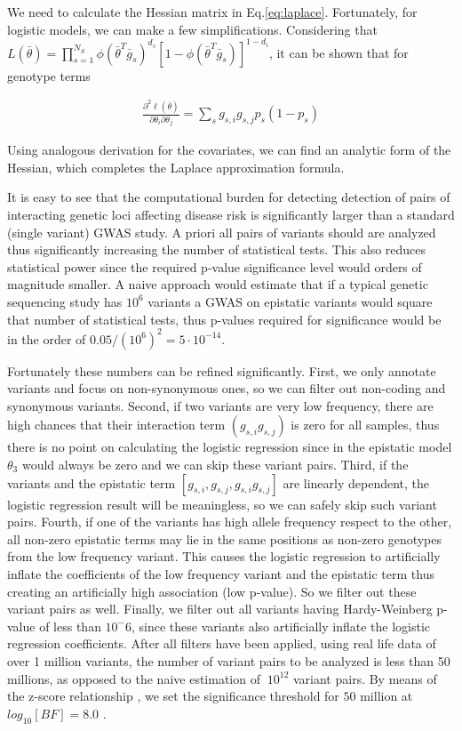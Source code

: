 We need to calculate the Hessian matrix in Eq.\ref{eq:laplace}. Fortunately, for logistic models, we can make a few simplifications. Considering that $L(\bar{\theta}) = \prod_{s=1}^{N_S}{ \phi( \bar{\theta}^T \bar{g}_s)^{d_s} [ 1-\phi( \bar{\theta}^T \bar{g}_s) ]^{1-d_i} }$, it can be shown that for genotype terms

\begin{eqnarray*}
	\frac{ \partial^2 \ell(\bar{\theta}) }{ \partial\theta_i \partial\theta_j } 
	= \sum_s{ g_{s,i} g_{s,j} p_s (1-p_s) } 
\end{eqnarray*}

Using analogous derivation for the covariates, we can find an analytic form of the Hessian, which completes the Laplace approximation formula.

It is easy to see that the computational burden for detecting detection of pairs of interacting genetic loci affecting disease risk is significantly larger than a standard (single variant) GWAS study. A priori all pairs of variants should are analyzed thus significantly increasing the number of statistical tests. This also reduces statistical power since the required p-value significance level would orders of magnitude smaller. A naive approach would estimate that if a typical genetic sequencing study has $10^6$ variants a GWAS on epistatic variants would square that number of statistical tests, thus p-values required for significance would be in the order of $0.05 / (10^6)^2 = 5 \cdot 10^{-14}$. 

Fortunately these numbers can be refined significantly. First, we only annotate variants and focus on non-synonymous ones, so we can filter out non-coding and synonymous variants. Second, if two variants are very low frequency, there are high chances that their interaction term $(g_{s,i} g_{s,j})$ is zero for all samples, thus there is no point on calculating the logistic regression since in the epistatic model $\theta_3$ would always be zero and we can skip these variant pairs. Third, if the variants and the epistatic term $[g_{s,i}, g_{s,j}, g_{s,i} g_{s,j}]$ are linearly dependent, the logistic regression result will be meaningless, so we can safely skip such variant pairs. Fourth, if one of the variants has high allele frequency respect to the other, all non-zero epistatic terms may lie in the same positions as non-zero genotypes from the low frequency variant. This causes the logistic regression to artificially inflate the coefficients of the low frequency variant and the epistatic term thus creating an artificially high association (low p-value). So we filter out these variant pairs as well. Finally, we filter out all variants having Hardy-Weinberg p-value of less than $10^-6$, since these variants also artificially inflate the logistic regression coefficients. After all filters have been applied, using real life data of over 1 million variants, the number of variant pairs to be analyzed is less than 50 millions, as opposed to the naive estimation of $~10^{12}$ variant pairs. By means of the z-score relationship \cite{goodman1999toward}, we set the significance threshold for $50$ million at $log_{10}[BF] =  8.0$ .

